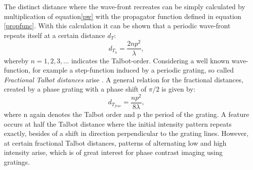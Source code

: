 The distinct distance where the wave-front recreates can be simply calculated by multiplication of equation\ref{pw} with the propagator function defined in equation \ref{propfunc}. With this calculation it can be shown that a periodic wave-front repeats itself at a certain distance $d_{T}$:
\begin{equation}\label{taldist}
d_{T_{n}} = \frac{2np^{2}}{\lambda},
\end{equation}
whereby $n = 1,2,3,...$ indicates the Talbot-order. Considering a well known wave-function, for example a step-function induced by a periodic grating, so called \textit{Fractional Talbot distances} arise \cite{Bech2009}. A general relation for the fractional distances, created by a phase grating with a phase shift of $\pi/2$ is given by:
\begin{equation}\label{fractal}
d_{T_{frac}} = \frac{n p^{2}}{8 \lambda},
\end{equation}
where n again denotes the Talbot order and p the period of the grating. 
A feature occurs at half the Talbot distance where the initial intensity pattern repeats exactly, besides of a shift in direction perpendicular to the grating lines. However, at certain fractional Talbot distances, patterns of alternating low and high intensity arise, which is of great interest for phase contrast imaging using gratings.
